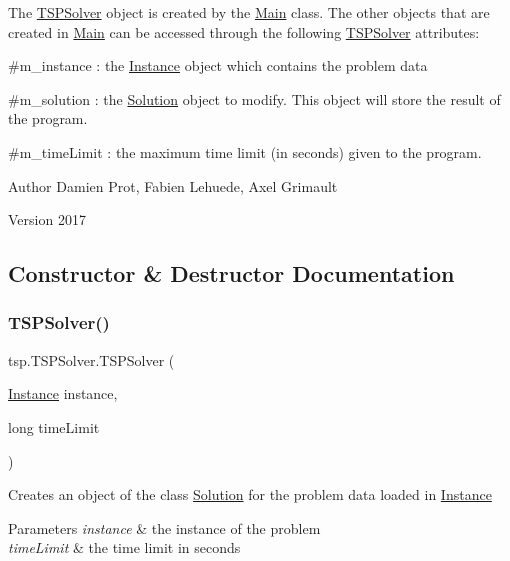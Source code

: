 The \mbox{\hyperlink{classtsp_1_1_t_s_p_solver}{T\+S\+P\+Solver}} object is created by the \mbox{\hyperlink{classtsp_1_1_main}{Main}} class. The other objects that are created in \mbox{\hyperlink{classtsp_1_1_main}{Main}} can be accessed through the following \mbox{\hyperlink{classtsp_1_1_t_s_p_solver}{T\+S\+P\+Solver}} attributes\+:
\begin{DoxyItemize}
\item \#m\+\_\+instance \+: the \mbox{\hyperlink{classtsp_1_1_instance}{Instance}} object which contains the problem data
\item \#m\+\_\+solution \+: the \mbox{\hyperlink{classtsp_1_1_solution}{Solution}} object to modify. This object will store the result of the program.
\item \#m\+\_\+time\+Limit \+: the maximum time limit (in seconds) given to the program.
\end{DoxyItemize}

\begin{DoxyAuthor}{Author}
Damien Prot, Fabien Lehuede, Axel Grimault 
\end{DoxyAuthor}
\begin{DoxyVersion}{Version}
2017 
\end{DoxyVersion}


\subsection{Constructor \& Destructor Documentation}
\mbox{\label{classtsp_1_1_t_s_p_solver_a0f6712f49bdce5b161b1bfd9f1112e91}} 
\subsubsection{\texorpdfstring{T\+S\+P\+Solver()}{TSPSolver()}}
{\footnotesize\ttfamily tsp.\+T\+S\+P\+Solver.\+T\+S\+P\+Solver (\begin{DoxyParamCaption}\item[{\mbox{\hyperlink{classtsp_1_1_instance}{Instance}}}]{instance,  }\item[{long}]{time\+Limit }\end{DoxyParamCaption})\hspace{0.3cm}{\ttfamily [inline]}}

Creates an object of the class \mbox{\hyperlink{classtsp_1_1_solution}{Solution}} for the problem data loaded in \mbox{\hyperlink{classtsp_1_1_instance}{Instance}} 
\begin{DoxyParams}{Parameters}
{\em instance} & the instance of the problem \\
\hline
{\em time\+Limit} & the time limit in seconds \\
\hline
\end{DoxyParams}



